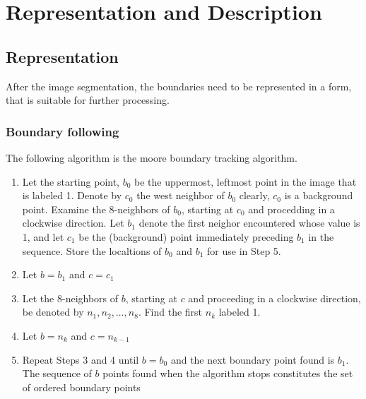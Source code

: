\section{Representation and Description}
\label{sec:representationDescription}
\subsection{Representation}
After the image segmentation, the boundaries need to be represented in a form, that is suitable for further processing.
\subsubsection{Boundary following}
The following algorithm is the moore boundary tracking algorithm.
\begin{enumerate}
\item Let the starting point, $b_0$ be the uppermost, leftmost point in the image that is labeled 1. Denote by $c_0$ the west neighbor of $b_0$ clearly, $c_0$ is a background point. Examine the 8-neighbors of $b_0$, starting at $c_0$ and procedding in a clockwise direction. Let $b_1$ denote the first neighor encountered whose value is 1, and let $c_1$ be the (background) point immediately preceding $b_1$ in the sequence. Store the localtions of $b_0$ and $b_1$ for use in Step 5.
\item Let $b=b_1$ and $c=c_1$
\item Let the 8-neighbors of $b$, starting at $c$ and proceeding in a clockwise direction, be denoted by $n_1,n_2,\ldots,n_8$. Find the first $n_k$ labeled 1.
\item Let $b=n_k$ and $c=n_{k-1}$
\item Repeat Steps 3 and 4 until $b=b_0$ and the next boundary point found is $b_1$. The sequence of $b$ points found when the algorithm stops constitutes the set of ordered boundary points
\end{enumerate}
